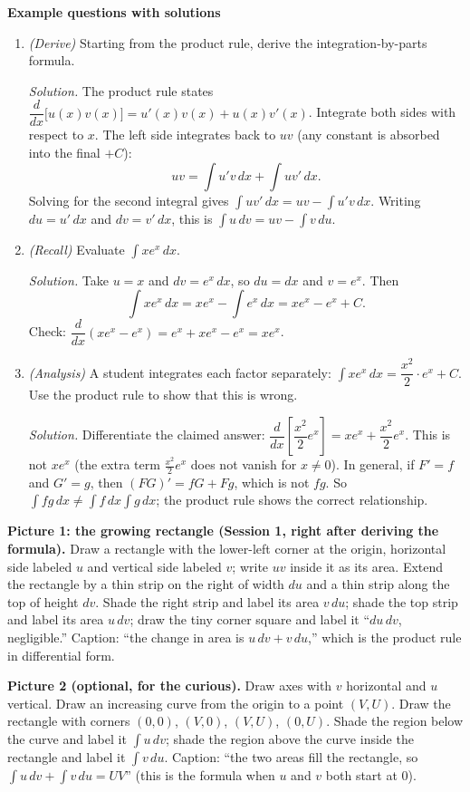 \documentclass[11pt]{article}
\begin{document}
\textbf{Example questions with solutions}
\begin{enumerate}
\item \emph{(Derive)} Starting from the product rule, derive the integration-by-parts formula.

\textit{Solution.} The product rule states $\dfrac{d}{dx}\big[u(x)v(x)\big] = u'(x)v(x) + u(x)v'(x)$. Integrate both sides with respect to $x$. The left side integrates back to $uv$ (any constant is absorbed into the final $+C$):
\[ uv = \int u'v\,dx + \int uv'\,dx. \]
Solving for the second integral gives $\int uv'\,dx = uv - \int u'v\,dx$. Writing $du = u'\,dx$ and $dv = v'\,dx$, this is $\int u\,dv = uv - \int v\,du$.

\item \emph{(Recall)} Evaluate $\displaystyle\int xe^x\,dx$.

\textit{Solution.} Take $u = x$ and $dv = e^x\,dx$, so $du = dx$ and $v = e^x$. Then
\[ \int xe^x\,dx = xe^x - \int e^x\,dx = xe^x - e^x + C. \]
Check: $\dfrac{d}{dx}(xe^x - e^x) = e^x + xe^x - e^x = xe^x$.

\item \emph{(Analysis)} A student integrates each factor separately: $\int xe^x\,dx = \dfrac{x^2}{2}\cdot e^x + C$. Use the product rule to show that this is wrong.

\textit{Solution.} Differentiate the claimed answer: $\dfrac{d}{dx}\left[\dfrac{x^2}{2}e^x\right] = xe^x + \dfrac{x^2}{2}e^x$. This is not $xe^x$ (the extra term $\frac{x^2}{2}e^x$ does not vanish for $x\neq 0$). In general, if $F' = f$ and $G' = g$, then $(FG)' = fG + Fg$, which is not $fg$. So $\int fg\,dx \neq \int f\,dx\int g\,dx$; the product rule shows the correct relationship.
\end{enumerate}

\begin{notebox}
\textbf{Picture 1: the growing rectangle (Session 1, right after deriving the formula).} Draw a rectangle with the lower-left corner at the origin, horizontal side labeled $u$ and vertical side labeled $v$; write $uv$ inside it as its area. Extend the rectangle by a thin strip on the right of width $du$ and a thin strip along the top of height $dv$. Shade the right strip and label its area $v\,du$; shade the top strip and label its area $u\,dv$; draw the tiny corner square and label it ``$du\,dv$, negligible.'' Caption: ``the change in area is $u\,dv + v\,du$,'' which is the product rule in differential form.

\textbf{Picture 2 (optional, for the curious).} Draw axes with $v$ horizontal and $u$ vertical. Draw an increasing curve from the origin to a point $(V, U)$. Draw the rectangle with corners $(0,0)$, $(V,0)$, $(V,U)$, $(0,U)$. Shade the region below the curve and label it $\int u\,dv$; shade the region above the curve inside the rectangle and label it $\int v\,du$. Caption: ``the two areas fill the rectangle, so $\int u\,dv + \int v\,du = UV$'' (this is the formula when $u$ and $v$ both start at $0$).
\end{notebox}
\end{document}
